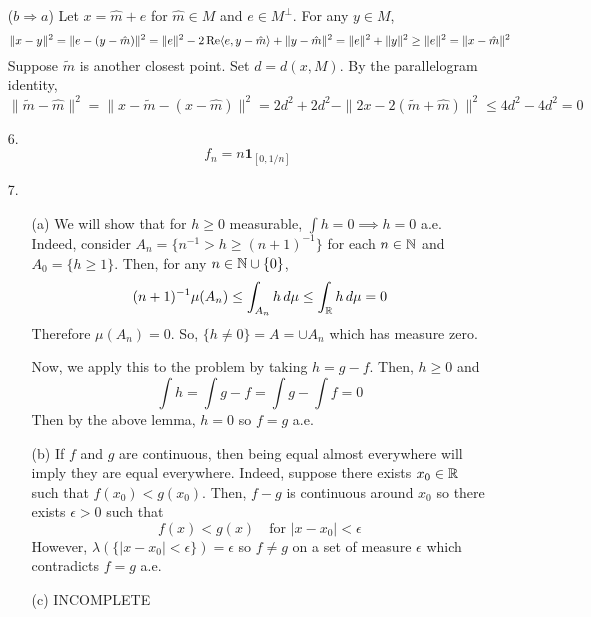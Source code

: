 \begin{itemize}
($b \Rightarrow a$) Let $x = \hat m + e$ for $\hat m \in M$ and $e \in M^\perp$. For any $y \in M$,
	\[ \| x-y\|^2 = \| e - (y-\hat m)\|^2= \|e\|^2 -2\operatorname{Re} \langle e,y-\hat m\rangle + \|y-\hat m\|^2 = \|e\|^2 + \|y\|^2 \ge \|e\|^2 =\|x-\hat m\|^2\]
Suppose $\tilde m$ is another closest point. Set $d=d(x,M)$. By the parallelogram identity,
	\[ \|\tilde m - \hat m \|^2 = \|x -\tilde m -(x-\hat m) \|^2 = 2d^2+2d^2 -\|2x-2(\tilde m+\hat m)\|^2 \le 4d^2 -4d^2 = 0 \]

\item[6.]
	\[ f_n = n \mathbf{1}_{[0,1/n]} \]

\item[7.] \label{q:s13-7}
\begin{itemize}
\item[(a)]We will show that for $h \ge0$ measurable, $\int h =0 \implies h=0$ a.e. Indeed, consider $A_n = \{ n^{-1} > h \ge (n+1)^{-1} \}$ for each $n \in \mathbb{N}$ and $A_0 = \{h \ge 1\}$. Then, for any $n \in \mathbb{N} \cup \{0\}$,
	\[ (n+1)^{-1} \mu(A_n) \le \int_{A_n} h \, d\mu \le \int_{\mathbb{R}} h\, d \mu = 0 \]
Therefore $\mu(A_n) = 0$. So, $\{h \ne 0 \} = A = \cup A_n$ which has measure zero. %

Now, we apply this to the problem by taking $h = g-f$. Then, $h \ge 0$ and
	\[ \int h = \int g-f = \int g - \int f = 0 \]
Then by the above lemma, $h=0$ so $f=g$ a.e.

\item[(b)] If $f$ and $g$ are continuous, then being equal almost everywhere will imply they are equal everywhere. Indeed, suppose there exists $x_0 \in \mathbb{R}$ such that $f(x_0) < g(x_0)$. Then, $f-g$ is continuous around $x_0$ so there exists $\epsilon >0$ such that
	\[ f(x) < g(x) \quad \mbox{for } |x-x_0| < \epsilon \]
However, $\lambda(\{|x-x_0|<\epsilon\})=\epsilon$ so $f \ne g$ on a set of measure $\epsilon$ which contradicts $f=g$ a.e.

\item[(c)] INCOMPLETE
\end{itemize}


\end{itemize}
